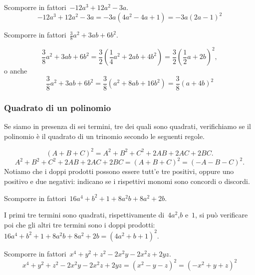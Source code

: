  \begin{esempio}
Scomporre in fattori~$-12a^{3}+12a^{2}-3a$.
\[-12a^{3}+12a^{2}-3a=-3a\left(4a^{2}-4a+1\right)=-3a(2a-1)^{2}\]
 \end{esempio}

 \begin{esempio}
Scomporre in fattori~$\frac{3}{8}a^{2}+3ab+6b^{2}$.

\[\frac{3}{8}a^{2}+3ab+6b^{2}=
  \frac{3}{2}\left(\frac{1}{4}a^{2}+2ab+4b^{2}\right)=
  \frac{3}{2}\left(\frac{1}{2}a+2b\right)^{2},\]
o anche
\[\frac{3}{8}a^{2}+3ab+6b^{2}=
  \frac{3}{8}\left(a^{2}+8ab+16b^{2} \right)=
  \frac{3}{8}\left(a+4b\right)^{2}\]
 \end{esempio}

\subsubsection{Quadrato di un polinomio}
\label{subsubsec:divpol_quadpol}

Se siamo in presenza di sei termini, tre dei quali sono quadrati, verifichiamo 
se il polinomio è il quadrato di un trinomio secondo le seguenti regole.

\begin{equation*}
(A+B+C)^{2}=A^{2}+B^{2}+C^{2}+2AB+2AC+2BC.
\end{equation*}
\begin{equation*}
A^{2}+B^{2}+C^{2}+2AB+2AC+2BC=(A+B+C)^{2}=(-A-B-C)^{2}.
\end{equation*}
Notiamo che i doppi prodotti possono essere tutt'e tre positivi, oppure uno 
positivo e due negativi: indicano se i rispettivi monomi sono concordi o 
discordi.

 \begin{esempio}
Scomporre in fattori~$16a^{4}+b^{2}+1+8a^{2}b+8a^{2}+2b$.

I primi tre termini sono quadrati, rispettivamente di~$4a^{2}$,$b$ e~$1$, 
si può verificare poi che gli altri tre termini sono i doppi 
prodotti:~$16a^{4}+b^{2}+1+8a^{2}b+8a^{2}+2b=\left(4a^{2}+b+1\right)^{2}$.
 \end{esempio}

 \begin{esempio}
Scomporre in fattori~$x^{4}+y^{2}+z^{2}-2x^{2}y-2x^{2}z+2yz$.
\[x^{4}+y^{2}+z^{2}-2x^{2}y-2x^{2}z+2yz=
  \left(x^{2}-y-z\right)^{2}=\left(-x^{2}+y+z\right)^{2}\]
 \end{esempio}


